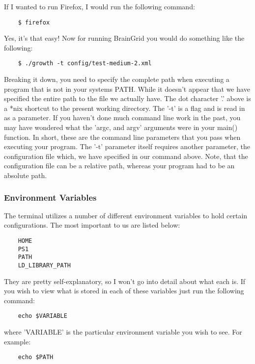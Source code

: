 If I wanted to run Firefox, I would run the following command:

	\begin{verbatim}
	$ firefox
	\end{verbatim}

Yes, it's that easy!  Now for running BrainGrid you would do something like the following:

	\begin{verbatim}
	$ ./growth -t config/test-medium-2.xml
	\end{verbatim}
	
Breaking it down, you need to specify the complete path when executing a program that is not in your systems PATH.  While it doesn't appear that we have specified the entire path to the file we actually have.  The dot character '.' above is a *nix shortcut to the present working directory.  The '-t' is a flag and is read in as a parameter.  If you haven't done much command line work in the past, you may have wondered what the 'argc, and argv' arguments were in your main() function.  In short, these are the command line parameters that you pass when executing your program.  The '-t' parameter itself requires another parameter, the configuration file which, we have specified in our command above.  Note, that the configuration file can be a relative path, whereas your program had to be an absolute path.


\subsubsection{Environment Variables} \mdseries 
The terminal utilizes a number of different environment variables to hold certain configurations.  The most important to us are listed below:
	\begin{verbatim}
	HOME
	PS1
	PATH
	LD_LIBRARY_PATH
	\end{verbatim}
	
They are pretty self-explanatory, so I won't go into detail about what each is.  If you wish to view what is stored in each of these variables just run the following command:

	\begin{verbatim}
	echo $VARIABLE
	\end{verbatim}
	
where 'VARIABLE' is the particular environment variable you wish to see.  For example:

	\begin{verbatim}
	echo $PATH
	\end{verbatim}


